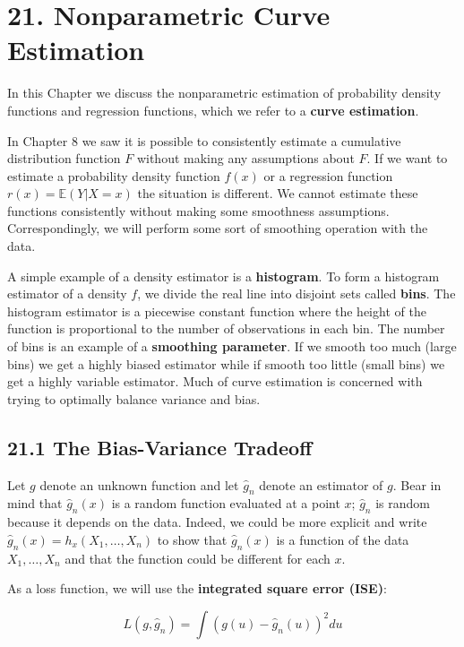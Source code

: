 \section*{21. Nonparametric Curve Estimation}\label{nonparametric-curve-estimation}

In this Chapter we discuss the nonparametric estimation of probability
density functions and regression functions, which we refer to a
\textbf{curve estimation}.

In Chapter 8 we saw it is possible to consistently estimate a cumulative
distribution function \(F\) without making any assumptions about \(F\).
If we want to estimate a probability density function \(f(x)\) or a
regression function \(r(x) = \mathbb{E}(Y | X = x)\) the situation is
different. We cannot estimate these functions consistently without
making some smoothness assumptions. Correspondingly, we will perform
some sort of smoothing operation with the data.

A simple example of a density estimator is a \textbf{histogram}. To form
a histogram estimator of a density \(f\), we divide the real line into
disjoint sets called \textbf{bins}. The histogram estimator is a
piecewise constant function where the height of the function is
proportional to the number of observations in each bin. The number of
bins is an example of a \textbf{smoothing parameter}. If we smooth too
much (large bins) we get a highly biased estimator while if smooth too
little (small bins) we get a highly variable estimator. Much of curve
estimation is concerned with trying to optimally balance variance and
bias.

\subsection*{21.1 The Bias-Variance Tradeoff}\label{the-bias-variance-tradeoff}

Let \(g\) denote an unknown function and let \(\hat{g}_{n}\) denote an
estimator of \(g\). Bear in mind that \(\hat{g}_{n}(x)\) is a random
function evaluated at a point \(x\); \(\hat{g}_{n}\) is random because it
depends on the data. Indeed, we could be more explicit and write
\(\hat{g}_{n}(x) = h_x(X_{1}, \dots, X_{n})\) to show that \(\hat{g}_{n}(x)\) is
a function of the data \(X_{1}, \dots, X_{n}\) and that the function could
be different for each \(x\).

As a loss function, we will use the \textbf{integrated square error
(ISE)}:

\[ L(g, \hat{g}_{n}) = \int (g(u) - \hat{g}_{n}(u))^{2} du\]


